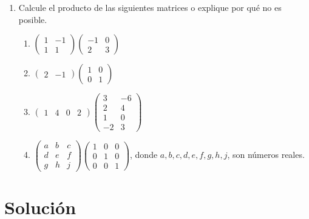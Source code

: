 \documentclass[12pt,letterpaper]{article}
\begin{document}
\begin{enumerate}
    
    \item  Calcule el producto de las siguientes matrices o explique por qué no es posible.
    \begin{enumerate}
        \item $\begin{pmatrix} 1 & -1 \\ 1 & 1 \end{pmatrix}\begin{pmatrix} -1 & 0 \\ 2 & 3   \end{pmatrix}$
        \item $\begin{pmatrix} 2 & -1\end{pmatrix}\begin{pmatrix} 1 & 0 \\ 0 & 1   \end{pmatrix}$
        \item $\begin{pmatrix} 1 & 4 & 0 & 2 \end{pmatrix}\begin{pmatrix} 3 & -6 \\ 2 & 4 \\ 1 & 0 \\ -2 & 3  \end{pmatrix}$
        \item $\begin{pmatrix} a & b & c \\ d & e & f \\ g & h & j \end{pmatrix}\begin{pmatrix} 1 & 0 & 0 \\ 0 & 1 & 0 \\ 0 & 0 & 1 \end{pmatrix}$, donde $a,b,c,d,e,f,g,h,j$, son números reales.
    \end{enumerate}
    
\end{enumerate}

\newpage

\section*{Solución}
\end{document}
